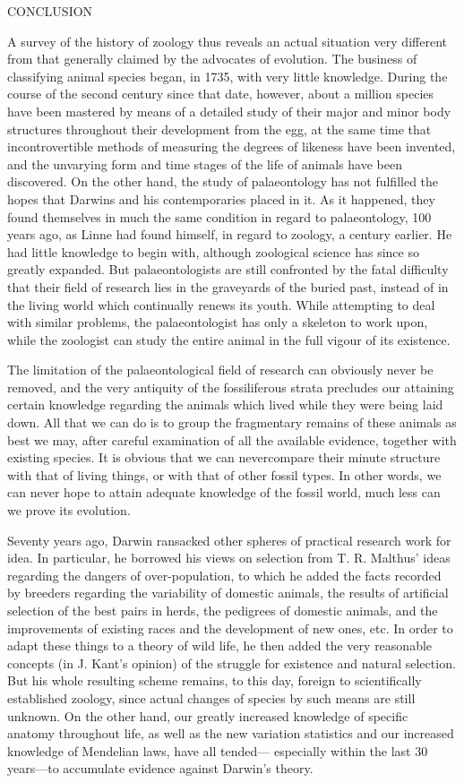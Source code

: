 CONCLUSION

A survey of the history of zoology thus reveals an actual situation very different from that
generally claimed by the advocates of evolution. The business of classifying animal species
began, in 1735, with very little knowledge. During the course of the second century since that
date, however, about a million species have been mastered by means of a detailed study of
their major and minor body structures throughout their development from the egg, at the
same time that incontrovertible methods of measuring the degrees of likeness have been
invented, and the unvarying form and time stages of the life of animals have been discovered.
On the other hand, the study of palaeontology has not fulfilled the hopes that Darwins and his
contemporaries placed in it. As it happened, they found themselves in much the same
condition in regard to palaeontology, 100 years ago, as Linne had found himself, in regard to
zoology, a century earlier. He had little knowledge to begin with, although zoological science
has since so greatly expanded. But palaeontologists are still confronted by the fatal difficulty
that their field of research lies in the graveyards of the buried past, instead of in the living
world which continually renews its youth. While attempting to deal with similar problems,
the palaeontologist has only a skeleton to work upon, while the zoologist can study the entire
animal in the full vigour of its existence.

The limitation of the palaeontological field of research can obviously never be removed, and
the very antiquity of the fossiliferous strata precludes our attaining certain knowledge
regarding the animals which lived while they were being laid down. All that we can do is to
group the fragmentary remains of these animals as best we may, after careful examination of
all the available evidence, together with existing species. It is obvious that we can nevercompare their minute structure with that of living things, or with that of other fossil types. In
other words, we can never hope to attain adequate knowledge of the fossil world, much less
can we prove its evolution.

Seventy years ago, Darwin ransacked other spheres of practical research work for idea. In
particular, he borrowed his views on selection from T. R. Malthus' ideas regarding the
dangers of over-population, to which he added the facts recorded by breeders regarding the
variability of domestic animals, the results of artificial selection of the best pairs in herds, the
pedigrees of domestic animals, and the improvements of existing races and the development
of new ones, etc. In order to adapt these things to a theory of wild life, he then added the very
reasonable concepts (in J. Kant's opinion) of the struggle for existence and natural selection.
But his whole resulting scheme remains, to this day, foreign to scientifically established
zoology, since actual changes of species by such means are still unknown. On the other hand,
our greatly increased knowledge of specific anatomy throughout life, as well as the new
variation statistics and our increased knowledge of Mendelian laws, have all tended—
especially within the last 30 years—to accumulate evidence against Darwin's theory.

